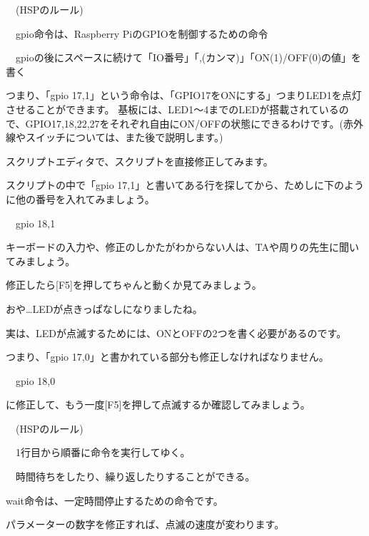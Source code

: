 \documentclass[a4paper,12pt]{jarticle}
\begin{document}
\bigskip

\ \ (HSPのルール)


\bigskip

\ \ gpio命令は、Raspberry PiのGPIOを制御するための命令

\ \ gpioの後にスペースに続けて「IO番号」「,(カンマ)」「ON(1)/OFF(0)の値」を書く


\bigskip

\bigskip

つまり、「gpio 17,1」という命令は、「GPIO17をONにする」つまりLED1を点灯させることができます。
基板には、LED1〜4までのLEDが搭載されているので、GPIO17,18,22,27をそれぞれ自由にON/OFFの状態にできるわけです。(赤外線やスイッチについては、また後で説明します。)


\bigskip

スクリプトエディタで、スクリプトを直接修正してみます。

スクリプトの中で「gpio 17,1」と書いてある行を探してから、ためしに下のように他の番号を入れてみましょう。


\bigskip

\ \ gpio 18,1


\bigskip


\bigskip

キーボードの入力や、修正のしかたがわからない人は、TAや周りの先生に聞いてみましょう。


\bigskip

修正したら[F5]を押してちゃんと動くか見てみましょう。

おや…LEDが点きっぱなしになりましたね。

実は、LEDが点滅するためには、ONとOFFの2つを書く必要があるのです。

つまり、「gpio
17,0」と書かれている部分も修正しなければなりません。


\bigskip

\ \ gpio 18,0


\bigskip

に修正して、もう一度[F5]を押して点滅するか確認してみましょう。


\bigskip

\ \ (HSPのルール)


\bigskip

\ \ 1行目から順番に命令を実行してゆく。

\ \ 時間待ちをしたり、繰り返したりすることができる。


\bigskip

wait命令は、一定時間停止するための命令です。

パラメーターの数字を修正すれば、点滅の速度が変わります。
\end{document}
